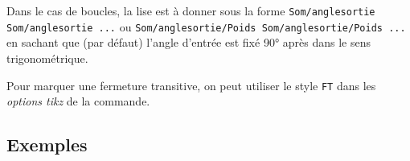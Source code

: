 \documentclass[french,a4paper,11pt]{article}
\begin{document}
{{\begin{tipblock}
\smallskip

Dans le cas de boucles, la lise est à donner sous la forme \verb|Som/anglesortie Som/anglesortie ...| ou \verb|Som/anglesortie/Poids Som/anglesortie/Poids ...| en sachant que (par défaut) l'angle d'entrée est fixé 90° après dans le sens trigonométrique.

\smallskip

Pour marquer une fermeture transitive, on peut utiliser le style \verb|FT| dans les \textit{options tikz} de la commande.
\end{tipblock}

\begin{DemoCode}[]
\begin{GrapheTikz}
\end{GrapheTikz}
\hspace{5mm}
\begin{GrapheTikz}
\end{GrapheTikz}
\hspace{5mm}
\begin{GrapheTikz}
\end{GrapheTikz}
\end{DemoCode}

\begin{DemoCode}[]
\begin{GrapheTikz}
\end{GrapheTikz}
\hspace{5mm}
\begin{GrapheTikz}
\end{GrapheTikz}
\end{DemoCode}

\begin{DemoCode}[]
\begin{GrapheTikz}
\end{GrapheTikz}
\end{DemoCode}

\subsection{Exemples}

}}
\end{document}
